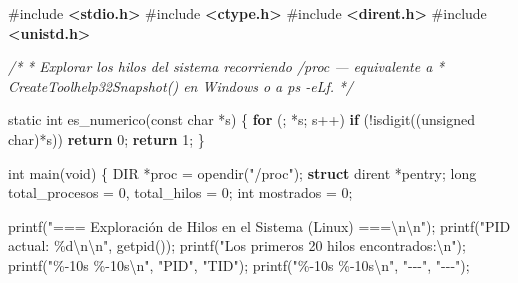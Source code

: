 \documentclass[
  spanish,
]{article}
\newenvironment{Shaded}{}{}
\newcommand{\CommentTok}[1]{\textcolor[rgb]{0.38,0.63,0.69}{\textit{#1}}}
\newcommand{\ControlFlowTok}[1]{\textcolor[rgb]{0.00,0.44,0.13}{\textbf{#1}}}
\newcommand{\DataTypeTok}[1]{\textcolor[rgb]{0.56,0.13,0.00}{#1}}
\newcommand{\DecValTok}[1]{\textcolor[rgb]{0.25,0.63,0.44}{#1}}
\newcommand{\ImportTok}[1]{\textcolor[rgb]{0.00,0.50,0.00}{\textbf{#1}}}
\newcommand{\KeywordTok}[1]{\textcolor[rgb]{0.00,0.44,0.13}{\textbf{#1}}}
\newcommand{\NormalTok}[1]{#1}
\newcommand{\OperatorTok}[1]{\textcolor[rgb]{0.40,0.40,0.40}{#1}}
\newcommand{\PreprocessorTok}[1]{\textcolor[rgb]{0.74,0.48,0.00}{#1}}
\newcommand{\SpecialCharTok}[1]{\textcolor[rgb]{0.25,0.44,0.63}{#1}}
\newcommand{\StringTok}[1]{\textcolor[rgb]{0.25,0.44,0.63}{#1}}
\begin{document}
\begin{Shaded}
\begin{Highlighting}[]
\PreprocessorTok{\#include }\ImportTok{\textless{}stdio.h\textgreater{}}
\PreprocessorTok{\#include }\ImportTok{\textless{}ctype.h\textgreater{}}
\PreprocessorTok{\#include }\ImportTok{\textless{}dirent.h\textgreater{}}
\PreprocessorTok{\#include }\ImportTok{\textless{}unistd.h\textgreater{}}

\CommentTok{/*}
\CommentTok{ * Explorar los hilos del sistema recorriendo /proc — equivalente a}
\CommentTok{ * CreateToolhelp32Snapshot() en Windows o a \textasciigrave{}ps {-}eLf\textasciigrave{}.}
\CommentTok{ */}

\DataTypeTok{static} \DataTypeTok{int}\NormalTok{ es\_numerico}\OperatorTok{(}\DataTypeTok{const} \DataTypeTok{char} \OperatorTok{*}\NormalTok{s}\OperatorTok{)} \OperatorTok{\{}
    \ControlFlowTok{for} \OperatorTok{(;} \OperatorTok{*}\NormalTok{s}\OperatorTok{;}\NormalTok{ s}\OperatorTok{++)}
        \ControlFlowTok{if} \OperatorTok{(!}\NormalTok{isdigit}\OperatorTok{((}\DataTypeTok{unsigned} \DataTypeTok{char}\OperatorTok{)*}\NormalTok{s}\OperatorTok{))} \ControlFlowTok{return} \DecValTok{0}\OperatorTok{;}
    \ControlFlowTok{return} \DecValTok{1}\OperatorTok{;}
\OperatorTok{\}}

\DataTypeTok{int}\NormalTok{ main}\OperatorTok{(}\DataTypeTok{void}\OperatorTok{)} \OperatorTok{\{}
\NormalTok{    DIR }\OperatorTok{*}\NormalTok{proc }\OperatorTok{=}\NormalTok{ opendir}\OperatorTok{(}\StringTok{"/proc"}\OperatorTok{);}
    \KeywordTok{struct}\NormalTok{ dirent }\OperatorTok{*}\NormalTok{pentry}\OperatorTok{;}
    \DataTypeTok{long}\NormalTok{ total\_procesos }\OperatorTok{=} \DecValTok{0}\OperatorTok{,}\NormalTok{ total\_hilos }\OperatorTok{=} \DecValTok{0}\OperatorTok{;}
    \DataTypeTok{int}\NormalTok{ mostrados }\OperatorTok{=} \DecValTok{0}\OperatorTok{;}

\NormalTok{    printf}\OperatorTok{(}\StringTok{"=== Exploración de Hilos en el Sistema (Linux) ===}\SpecialCharTok{\textbackslash{}n\textbackslash{}n}\StringTok{"}\OperatorTok{);}
\NormalTok{    printf}\OperatorTok{(}\StringTok{"PID actual: }\SpecialCharTok{\%d\textbackslash{}n\textbackslash{}n}\StringTok{"}\OperatorTok{,}\NormalTok{ getpid}\OperatorTok{());}
\NormalTok{    printf}\OperatorTok{(}\StringTok{"Los primeros 20 hilos encontrados:}\SpecialCharTok{\textbackslash{}n}\StringTok{"}\OperatorTok{);}
\NormalTok{    printf}\OperatorTok{(}\StringTok{"}\SpecialCharTok{\%{-}10s}\StringTok{ }\SpecialCharTok{\%{-}10s\textbackslash{}n}\StringTok{"}\OperatorTok{,} \StringTok{"PID"}\OperatorTok{,} \StringTok{"TID"}\OperatorTok{);}
\NormalTok{    printf}\OperatorTok{(}\StringTok{"}\SpecialCharTok{\%{-}10s}\StringTok{ }\SpecialCharTok{\%{-}10s\textbackslash{}n}\StringTok{"}\OperatorTok{,} \StringTok{"{-}{-}{-}"}\OperatorTok{,} \StringTok{"{-}{-}{-}"}\OperatorTok{);}


\end{Highlighting}
\end{Shaded}
\end{document}
